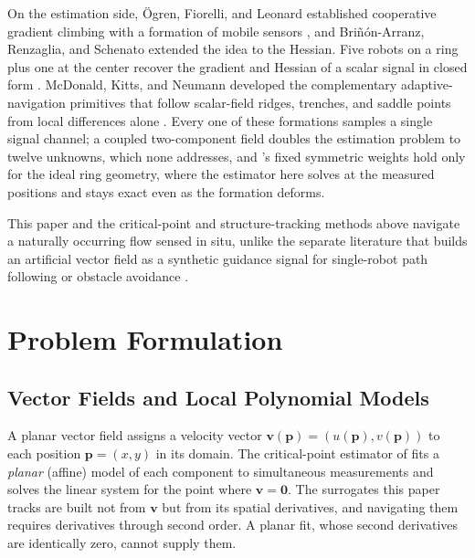 \documentclass[lettersize,journal]{IEEEtran}
\begin{document}
On the estimation side, \"{O}gren, Fiorelli, and Leonard established
cooperative gradient climbing with a formation of mobile sensors
\cite{2}, and Bri\~{n}\'{o}n-Arranz, Renzaglia, and Schenato extended
the idea to the Hessian. Five robots on a ring plus one at the center
recover the gradient and Hessian of a scalar signal in closed form
\cite{6}. McDonald, Kitts, and Neumann developed the complementary
adaptive-navigation primitives that follow scalar-field ridges,
trenches, and saddle points from local differences alone
\cite{3,4,5}. Every one of these formations samples a single signal
channel; a coupled two-component field doubles the estimation problem
to twelve unknowns, which none addresses, and \cite{6}'s fixed
symmetric weights hold only for the ideal ring geometry, where the
estimator here solves at the measured positions and stays exact even
as the formation deforms.

This paper and the critical-point and structure-tracking methods above
\cite{9,17,18,19,20,21} navigate a naturally occurring flow sensed in
situ, unlike the separate literature that builds an artificial vector
field as a synthetic guidance signal for single-robot path following
\cite{33} or obstacle avoidance \cite{34}.

\section{Problem Formulation}
\label{sec:detj_field}

\subsection{Vector Fields and Local Polynomial Models}

A planar vector field assigns a velocity vector $\mathbf{v}(\mathbf{p}) =
(u(\mathbf{p}), v(\mathbf{p}))$ to each position $\mathbf{p} = (x, y)$ in its
domain. The critical-point estimator of \cite{9} fits a \emph{planar}
(affine) model of each component to simultaneous measurements and solves
the linear system for the point where $\mathbf{v} = \mathbf{0}$. The
surrogates this paper tracks are built not from $\mathbf{v}$ but from its
spatial derivatives, and navigating them requires derivatives through
second order. A planar fit, whose second derivatives are identically zero,
cannot supply them.
\end{document}
